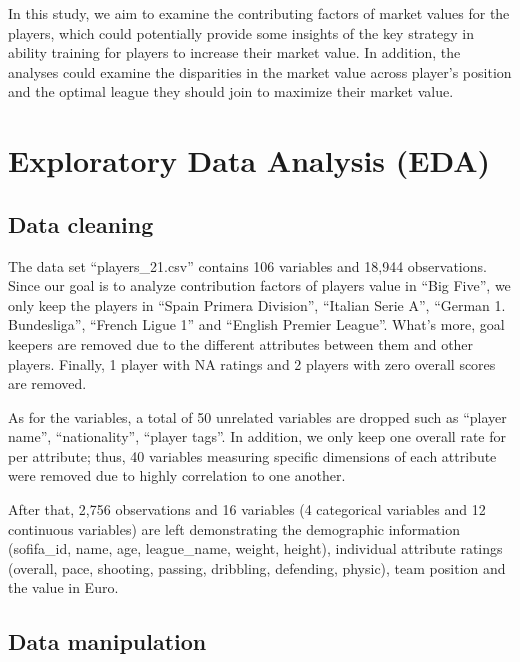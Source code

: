 \documentclass[
]{article}
\begin{document}
In this study, we aim to examine the contributing factors of market
values for the players, which could potentially provide some insights of
the key strategy in ability training for players to increase their
market value. In addition, the analyses could examine the disparities in
the market value across player's position and the optimal league they
should join to maximize their market value.

\hypertarget{exploratory-data-analysis-eda}{%
\section{Exploratory Data Analysis
(EDA)}\label{exploratory-data-analysis-eda}}

\hypertarget{data-cleaning}{%
\subsection{Data cleaning}\label{data-cleaning}}

The data set ``players\_21.csv'' contains 106 variables and 18,944
observations. Since our goal is to analyze contribution factors of
players value in ``Big Five'', we only keep the players in ``Spain
Primera Division'', ``Italian Serie A'', ``German 1. Bundesliga'',
``French Ligue 1'' and ``English Premier League''. What's more, goal
keepers are removed due to the different attributes between them and
other players. Finally, 1 player with NA ratings and 2 players with zero
overall scores are removed.

As for the variables, a total of 50 unrelated variables are dropped such
as ``player name'', ``nationality'', ``player tags''. In addition, we
only keep one overall rate for per attribute; thus, 40 variables
measuring specific dimensions of each attribute were removed due to
highly correlation to one another.

After that, 2,756 observations and 16 variables (4 categorical variables
and 12 continuous variables) are left demonstrating the demographic
information (sofifa\_id, name, age, league\_name, weight, height),
individual attribute ratings (overall, pace, shooting, passing,
dribbling, defending, physic), team position and the value in Euro.

\hypertarget{data-manipulation}{%
\subsection{Data manipulation}\label{data-manipulation}}
\end{document}
